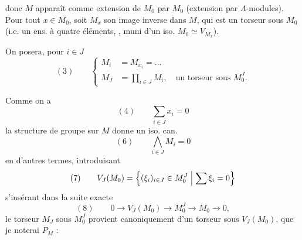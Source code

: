 \documentclass[11pt,a4paper]{article}
\begin{document}

donc $M$ apparaît comme extension de $M_0$ par $M_0$ (extension par $\Lambda$-modules). Pour tout $x \in M_0$, soit $M_x$ son image inverse dans $M$, qui est un torseur sous $M_0$ (i.e. un ens. à quatre éléments, , muni d'un iso. $M_0 \simeq V_{M_x}$).

On posera, pour $i \in J$
\[
  (3) \qquad
  \left\{
  \begin{aligned}
    M_i &= M_{x_i} = \ldots \\
    M_J &= \prod_{i \in J} M_i, \quad \text{un torseur sous } M_0^J .
  \end{aligned}
  \right.
\]

Comme on a
\[
  (4) \qquad \sum_{i \in J} x_i = 0
\]
la structure de groupe sur $M$ donne un iso. can.
\[
  (6) \qquad \bigwedge_{i \in J} M_i = 0
\]
en d'autres termes, introduisant
\[
  (7) \qquad V_J(M_0) = \Bigl\{ (\xi_i)_{i \in J} \in M_0^J \Bigm| \sum \xi_i = 0 \Bigr\}
\]
s'insérant dans la suite exacte
\[
  (8) \qquad 0 \to V_J(M_0) \to M_0^J \to M_0 \to 0 ,
\]
le torseur $M_J$ sous $M_0^J$ provient canoniquement d'un torseur sous $V_J(M_0)$, que je noterai $P_M$ :
\end{document}
